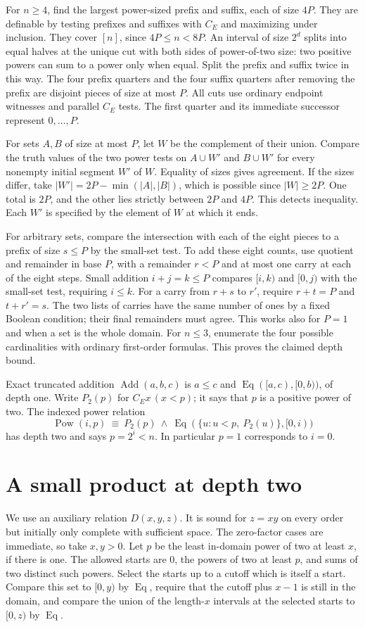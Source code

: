 \documentclass[11pt]{article}
\newcommand{\Eq}{\operatorname{Eq}}
\newcommand{\Add}{\operatorname{Add}}
\newcommand{\Pow}{\operatorname{Pow}}
\begin{document}
For \(n\geq4\), find the largest power-sized prefix and suffix,
each of size \(4P\). They are definable by testing prefixes and
suffixes with \(C_E\) and maximizing under inclusion.
They cover \([n]\), since \(4P\leq n<8P\).
An interval of size \(2^d\) splits into equal halves at the unique cut
with both sides of power-of-two size: two positive powers can sum
to a power only when equal. Split the prefix and suffix twice in
this way. The four prefix quarters and the four suffix quarters
after removing the prefix are disjoint pieces of size at most \(P\).
All cuts use ordinary endpoint witnesses and parallel \(C_E\) tests.
The first quarter and its immediate successor represent \(0,\ldots,P\).

For sets \(A,B\) of size at most \(P\), let \(W\) be the
complement of their union. Compare the truth values of the two power
tests on \(A\cup W'\) and \(B\cup W'\) for every nonempty initial
segment \(W'\) of \(W\). Equality of sizes gives agreement. If the
sizes differ, take \(|W'|=2P-\min(|A|,|B|)\), which is possible
since \(|W|\geq 2P\). One total is \(2P\), and the other lies
strictly between \(2P\) and \(4P\). This detects inequality.
Each \(W'\) is specified by the element of \(W\) at which it ends.

For arbitrary sets, compare the intersection with each of the eight
pieces to a prefix of size \(s\leq P\) by the small-set test.
To add these eight counts, use quotient and remainder in base \(P\),
with a remainder \(r<P\) and at most one carry at each of the eight
steps. Small addition \(i+j=k\leq P\) compares \([i,k)\) and
\([0,j)\) with the small-set test, requiring \(i\leq k\).
For a carry from \(r+s\) to \(r'\), require \(r+t=P\) and
\(t+r'=s\). The two lists of carries have the same number of ones
by a fixed Boolean condition; their final remainders must agree.
This works also for \(P=1\) and when a set is the whole domain.
For \(n\leq3\), enumerate the four possible cardinalities with
ordinary first-order formulas. This proves the claimed depth bound.

Exact truncated addition \(\Add(a,b,c)\) is \(a\leq c\) and
\(\Eq([a,c),[0,b))\), of depth one. Write \(P_2(p)\) for
\(C_E x\,(x<p)\); it says that \(p\) is a positive power of two.
The indexed power relation
\[
 \Pow(i,p)\ \equiv\ P_2(p)\ \land\
   \Eq(\{u:u<p,\ P_2(u)\},[0,i))
\]
has depth two and says \(p=2^i<n\). In particular \(p=1\)
corresponds to \(i=0\).

\section{A small product at depth two}\label{s:small}
We use an auxiliary relation \(D(x,y,z)\). It is sound for
\(z=xy\) on every order but initially only complete with sufficient
space. The zero-factor cases are immediate, so take \(x,y>0\).
Let \(p\) be the least in-domain power of two at least \(x\), if
there is one. The allowed starts are \(0\), the powers of two at
least \(p\), and sums of two distinct such powers. Select the starts
up to a cutoff which is itself a start. Compare this set to
\([0,y)\) by \(\Eq\), require that the cutoff plus \(x-1\) is still
in the domain, and compare the union of the length-\(x\) intervals
at the selected starts to \([0,z)\) by \(\Eq\).
\end{document}
